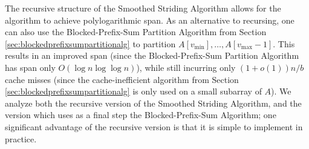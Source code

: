 \documentclass[twoside,leqno,twocolumn]{article}
\newcommand{\defn}[1]{{\textit{\textbf{\boldmath #1}}}}
\begin{document}
The recursive structure of the Smoothed Striding Algorithm allows for
the algorithm to achieve polylogarithmic span. As an alternative to
recursing, one can also use the Blocked-Prefix-Sum Partition
Algorithm from Section \ref{sec:blockedprefixsumpartitionalg} 
to partition $A[v_{\text{min}}], \ldots, A[v_{\text{max}} - 1]$. 
This results in an improved span (since the
Blocked-Prefix-Sum Partition Algorithm has span only $O(\log n \log \log
n)$), while still incurring only $(1 + o(1))n/b$ cache misses (since
the cache-inefficient algorithm from Section
\ref{sec:blockedprefixsumpartitionalg} is only used
on a small subarray of $A$). We analyze both the recursive version of
the Smoothed Striding Algorithm, and the version which uses as a final
step the Blocked-Prefix-Sum Algorithm; one significant advantage
of the recursive version is that it is simple to implement in
practice.




\end{document}
